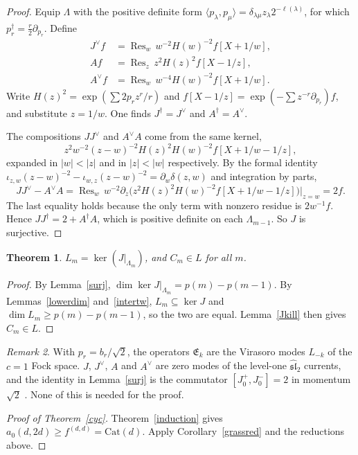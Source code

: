 \documentclass[11pt]{article}
\newtheorem{theorem}{Theorem}
\theoremstyle{definition}
\theoremstyle{remark}
\newtheorem{remark}[theorem]{Remark}
\newcommand{\La}{\Lambda}
\newcommand{\Res}{\operatorname{Res}}
\newcommand{\fE}{\mathfrak{E}}
\begin{document}
\begin{proof}
Equip $\La$ with the positive definite form $\langle p_\lambda,p_\mu\rangle=\delta_{\lambda\mu}z_\lambda
2^{-\ell(\lambda)}$, for which $p_r^\dagger=\frac r2\partial_{p_r}$. Define
\begin{align*}
  J^\vee f&=\Res_w\,w^{-2}H(w)^{-2}f[X+1/w],\\
  Af&=\Res_z\,z^2H(z)^2f[X-1/z],\\
  A^\vee f&=\Res_w\,w^{-4}H(w)^{-2}f[X+1/w].
\end{align*}
Write $H(z)^2=\exp(\sum2p_rz^r/r)$ and $f[X-1/z]=\exp(-\sum z^{-r}\partial_{p_r})f$, and substitute $z=1/w$. One
finds $J^\dagger=J^\vee$ and $A^\dagger=A^\vee$.

The compositions $JJ^\vee$ and $A^\vee A$ come from the same kernel,
\[
  z^2w^{-2}(z-w)^{-2}H(z)^2H(w)^{-2}f[X+1/w-1/z],
\]
expanded in $|w|<|z|$ and in $|z|<|w|$ respectively. By the formal identity
$\iota_{z,w}(z-w)^{-2}-\iota_{w,z}(z-w)^{-2}=\partial_w\delta(z,w)$ and integration by parts,
\[
  JJ^\vee-A^\vee A=\Res_w\,w^{-2}\partial_z\bigl(z^2H(z)^2H(w)^{-2}f[X+1/w-1/z]\bigr)\big|_{z=w}=2f .
\]
The last equality holds because the only term with nonzero residue is $2w^{-1}f$. Hence
$JJ^\dagger=2+A^\dagger A$, which is positive definite on each $\La_{m-1}$. So $J$ is surjective.
\end{proof}

\begin{theorem}\label{claimA}
$L_m=\ker(J|_{\La_m})$, and $C_m\in L$ for all $m$.
\end{theorem}

\begin{proof}
By Lemma~\ref{surj}, $\dim\ker J|_{\La_m}=p(m)-p(m-1)$. By Lemmas~\ref{lowerdim} and~\ref{intertw}, $L_m\subseteq\ker
J$ and $\dim L_m\ge p(m)-p(m-1)$, so the two are equal. Lemma~\ref{Jkill} then gives $C_m\in L$.
\end{proof}

\begin{remark}
With $p_r=b_r/\sqrt2$, the operators $\fE_k$ are the Virasoro modes $L_{-k}$ of the $c=1$ Fock space. $J$, $J^\vee$, $A$ and $A^\vee$ are zero modes of the level-one $\widehat{\mathfrak{sl}}_2$ currents, and the identity in
Lemma~\ref{surj} is the commutator $[J_0^+,J_0^-]=2$ in momentum $\sqrt2$ \cite{KR}. None of this is needed for
the proof.
\end{remark}

\begin{proof}[Proof of Theorem~\ref{cyc}]
Theorem~\ref{induction} gives $a_0(d,2d)\ge f^{(d,d)}=\mathrm{Cat}(d)$. Apply Corollary~\ref{grassred} and the
reductions above.
\end{proof}
\end{document}
